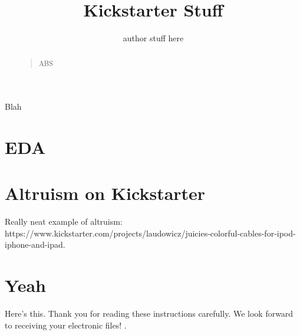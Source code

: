 \documentclass[letterpaper]{article}
\begin{document}
%
\title{Kickstarter Stuff}
\author{author stuff here
}
\maketitle
\begin{abstract}
\begin{quote}
ABS
\end{quote}
\end{abstract}

\noindent Blah

\section{EDA}



\section{Altruism on Kickstarter}

Really neat example of altruism: https://www.kickstarter.com/projects/laudowicz/juicies-colorful-cables-for-ipod-iphone-and-ipad.

\section{Yeah}
Here's this. Thank you for reading these instructions carefully. We look forward to receiving your electronic files! \cite{rumelhart1988learning}.

 
\end{document}
